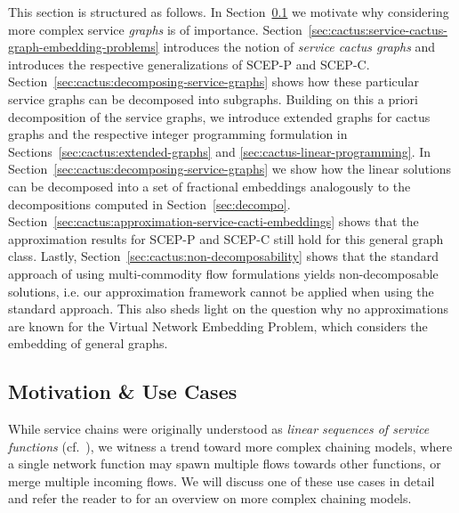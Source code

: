 \documentclass[10pt, conference, letterpaper]{IEEEtran}
\begin{document}
This section is structured as follows. In Section~\ref{sec:cactus-motivation} we motivate why considering more complex service \emph{graphs} is of importance. Section~\ref{sec:cactus:service-cactus-graph-embedding-problems} introduces the notion of \emph{service cactus graphs} and introduces the respective generalizations of SCEP-P and SCEP-C. Section~\ref{sec:cactus:decomposing-service-graphs} shows how these particular service graphs can be decomposed into subgraphs. Building on this a priori decomposition of the service graphs, we introduce extended graphs for cactus graphs and the respective integer programming formulation in Sections~\ref{sec:cactus:extended-graphs} and \ref{sec:cactus-linear-programming}. In Section~\ref{sec:cactus:decomposing-service-graphs} we show how the linear solutions can be decomposed into a set of fractional embeddings analogously to the decompositions computed in Section~\ref{sec:decompo}. Section~\ref{sec:cactus:approximation-service-cacti-embeddings} shows that the approximation results for SCEP-P and SCEP-C still hold for this general graph class. Lastly, Section~\ref{sec:cactus:non-decomposability} shows that the standard approach of using multi-commodity flow formulations yields non-decomposable solutions, i.e. our approximation framework cannot be applied when using the standard approach. This also sheds light on the question why no approximations are known for the Virtual Network Embedding Problem, which considers the embedding of general graphs.

\subsection{Motivation \& Use Cases}
\label{sec:cactus-motivation}

While service chains were originally understood as \emph{linear sequences
of service functions} (cf.~\cite{merlin}), 
we witness a trend toward more 
complex chaining models, where a single network function may spawn multiple flows towards other functions, or merge multiple incoming flows. We will discuss one of these use cases in detail and refer the reader to 
\cite{etsi2013network, gember2014opennf,  ietf-draft-sc-use-cases-mobile-networks,ietf-draft-sc-use-cases-dc,mehraghdam2014specifying} for an overview on more complex chaining models.
\end{document}
